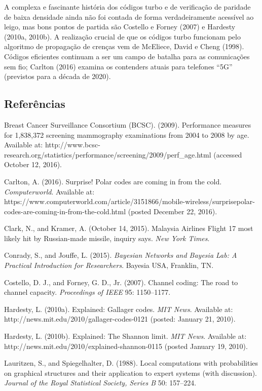 \documentclass[11pt,a5paper,twoside]{book}
\begin{document}
A complexa e fascinante história dos códigos turbo e de verificação de paridade de baixa densidade ainda não foi contada de forma verdadeiramente acessível ao leigo, mas bons pontos de partida são Costello e Forney (2007) e Hardesty (2010a, 2010b). A realização crucial de que os códigos turbo funcionam pelo algoritmo de propagação de crenças vem de McEliece, David e Cheng (1998). Códigos eficientes continuam a ser um campo de batalha para as comunicações sem fio; Carlton (2016) examina os contenders atuais para telefones “5G” (previstos para a década de 2020).

\subsection{Referências}
Breast Cancer Surveillance Consortium (BCSC). (2009). Performance measures for 1,838,372 screening mammography examinations from 2004 to 2008 by age. Available at: http://www.bcsc-research.org/statistics/performance/screening/2009/perf\_age.html (accessed October 12, 2016).

Carlton, A. (2016). Surprise! Polar codes are coming in from the cold. \textit{Computerworld}. Available at: https://www.computerworld.com/article/3151866/mobile-wireless/surprisepolar-codes-are-coming-in-from-the-cold.html (posted December 22, 2016).

Clark, N., and Kramer, A. (October 14, 2015). Malaysia Airlines Flight 17 most likely hit by Russian-made missile, inquiry says. \textit{New York Times}.

Conrady, S., and Jouffe, L. (2015). \textit{Bayesian Networks and Bayesia Lab: A Practical Introduction for Researchers}. Bayesia USA, Franklin, TN.

Costello, D. J., and Forney, G. D., Jr. (2007). Channel coding: The road to channel capacity. \textit{Proceedings of IEEE} 95: 1150–1177.

Hardesty, L. (2010a). Explained: Gallager codes. \textit{MIT News}. Available at: http://news.mit.edu/2010/gallager-codes-0121 (posted: January 21, 2010).

Hardesty, L. (2010b). Explained: The Shannon limit. \textit{MIT News}. Available at: http://news.mit.edu/2010/explained-shannon-0115 (posted January 19, 2010).

Lauritzen, S., and Spiegelhalter, D. (1988). Local computations with probabilities on graphical structures and their application to expert systems (with discussion). \textit{Journal of the Royal Statistical Society, Series B} 50: 157–224.
\end{document}
